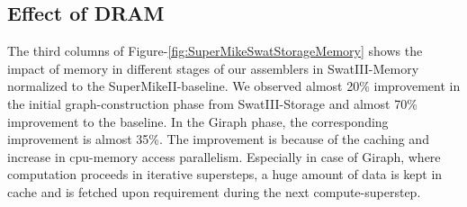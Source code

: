 \documentclass[conference]{IEEEtran}
\begin{document}
\subsection {Effect of DRAM} \label{EffectOfDRAM}
The third columns of Figure-\ref{fig:SuperMikeSwatStorageMemory} shows the impact of memory in different stages of our assemblers in SwatIII-Memory normalized to the SuperMikeII-baseline. 
We observed almost 20\% improvement in the initial graph-construction phase from SwatIII-Storage and almost 70\% improvement to the baseline. %
In the Giraph phase, the corresponding improvement is almost 35\%. 
The improvement is because of the caching and increase in cpu-memory access parallelism.
Especially in case of Giraph, where computation proceeds in iterative supersteps, a huge amount of data is kept in cache and is fetched upon requirement during the next compute-superstep.
\end{document}
